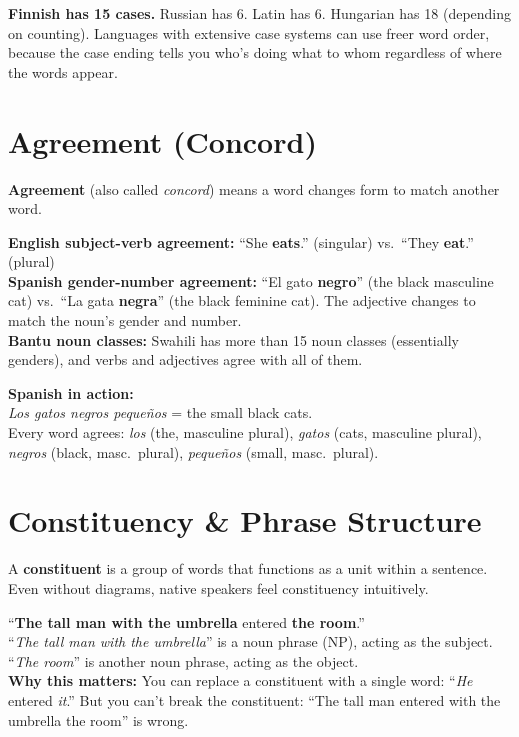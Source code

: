 \documentclass[11pt, letterpaper]{article}
\newcommand{\example}[1]{%
  \begin{tcolorbox}[colback=exbg, colframe=exborder,
    title={\bfseries Example}, arc=3pt, boxrule=1pt]
  #1
  \end{tcolorbox}%
}
\begin{document}
\textbf{Finnish has 15 cases.} Russian has 6. Latin has 6. Hungarian has 18 (depending on counting). Languages with extensive case systems can use freer word order, because the case ending tells you who's doing what to whom regardless of where the words appear.

\section*{Agreement (Concord)}

\textbf{Agreement} (also called \emph{concord}) means a word changes form to match another word.

\textbf{English subject-verb agreement:} ``She \textbf{eats}.'' (singular) vs.\ ``They \textbf{eat}.'' (plural)\\
\textbf{Spanish gender-number agreement:} ``El gato \textbf{negro}'' (the black masculine cat) vs.\ ``La gata \textbf{negra}'' (the black feminine cat). The adjective changes to match the noun's gender and number.\\
\textbf{Bantu noun classes:} Swahili has more than 15 noun classes (essentially genders), and verbs and adjectives agree with all of them.

\example{
\textbf{Spanish in action:}\\
\emph{Los gatos negros peque\~nos} = the small black cats.\\
Every word agrees: \emph{los} (the, masculine plural), \emph{gatos} (cats, masculine plural), \emph{negros} (black, masc.\ plural), \emph{peque\~nos} (small, masc.\ plural).
}

\section*{Constituency \& Phrase Structure}

A \textbf{constituent} is a group of words that functions as a unit within a sentence. Even
without diagrams, native speakers feel constituency intuitively.

\example{
``\textbf{The tall man with the umbrella} entered \textbf{the room}.''\\
\quad ``\emph{The tall man with the umbrella}'' is a noun phrase (NP), acting as the subject.\\
\quad ``\emph{The room}'' is another noun phrase, acting as the object.\\[4pt]
\textbf{Why this matters:} You can replace a constituent with a single word: ``\emph{He} entered \emph{it}.'' But you can't break the constituent: ``The tall man entered with the umbrella the room'' is wrong.
}
\end{document}
